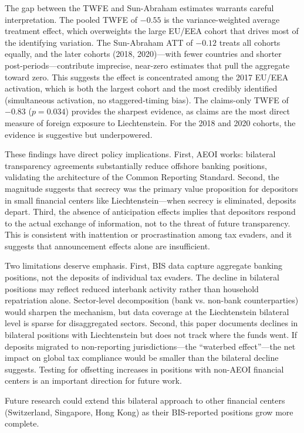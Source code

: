 \documentclass[12pt]{article}
\begin{document}
The gap between the TWFE and Sun-Abraham estimates warrants careful interpretation. The pooled TWFE of $-0.55$ is the variance-weighted average treatment effect, which overweights the large EU/EEA cohort that drives most of the identifying variation. The Sun-Abraham ATT of $-0.12$ treats all cohorts equally, and the later cohorts (2018, 2020)---with fewer countries and shorter post-periods---contribute imprecise, near-zero estimates that pull the aggregate toward zero. This suggests the effect is concentrated among the 2017 EU/EEA activation, which is both the largest cohort and the most credibly identified (simultaneous activation, no staggered-timing bias). The claims-only TWFE of $-0.83$ ($p = 0.034$) provides the sharpest evidence, as claims are the most direct measure of foreign exposure to Liechtenstein. For the 2018 and 2020 cohorts, the evidence is suggestive but underpowered.

These findings have direct policy implications. First, AEOI works: bilateral transparency agreements substantially reduce offshore banking positions, validating the architecture of the Common Reporting Standard. Second, the magnitude suggests that secrecy was the primary value proposition for depositors in small financial centers like Liechtenstein---when secrecy is eliminated, deposits depart. Third, the absence of anticipation effects implies that depositors respond to the actual exchange of information, not to the threat of future transparency. This is consistent with inattention or procrastination among tax evaders, and it suggests that announcement effects alone are insufficient.

Two limitations deserve emphasis. First, BIS data capture aggregate banking positions, not the deposits of individual tax evaders. The decline in bilateral positions may reflect reduced interbank activity rather than household repatriation alone. Sector-level decomposition (bank vs. non-bank counterparties) would sharpen the mechanism, but data coverage at the Liechtenstein bilateral level is sparse for disaggregated sectors. Second, this paper documents declines in bilateral positions with Liechtenstein but does not track where the funds went. If deposits migrated to non-reporting jurisdictions---the ``waterbed effect''---the net impact on global tax compliance would be smaller than the bilateral decline suggests. Testing for offsetting increases in positions with non-AEOI financial centers is an important direction for future work.

Future research could extend this bilateral approach to other financial centers (Switzerland, Singapore, Hong Kong) as their BIS-reported positions grow more complete.
\end{document}
